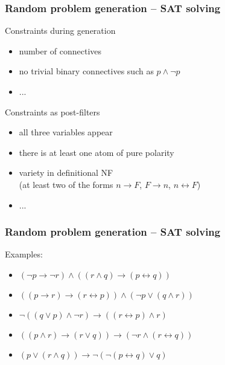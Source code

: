 \documentclass[xcolor={table}]{beamer}
\newcommand{\limpl}{\rightarrow}
\newcommand{\liff}{\leftrightarrow}
\begin{document}
\begin{frame}
    \frametitle{Random problem generation -- SAT solving}

    Constraints during generation
    \begin{itemize}
        \item
            number of connectives
        \item
            no trivial binary connectives such as $p \land \lnot p$
        \item
            ...
    \end{itemize}

    \bigskip
    \pause

    Constraints as post-filters
    \begin{itemize}
        \item
            all three variables appear
        \item
            there is at least one atom of pure polarity
        \item
            variety in definitional NF \\
            (at least two of the forms $n \limpl F$, $F \limpl n$, $n \liff F$)
        \item
            ...
    \end{itemize}
\end{frame}

\begin{frame}
    \frametitle{Random problem generation -- SAT solving}

    Examples:
    \begin{itemize}
        \item $ ( \lnot p \rightarrow \lnot r ) \land ( ( r \land q ) \rightarrow ( p \leftrightarrow q ) ) $
        \item $ ( ( p \rightarrow r ) \rightarrow ( r \leftrightarrow p ) ) \land ( \lnot p \lor ( q \land r ) ) $
        \item $ \lnot ( ( q \lor p ) \land \lnot r ) \rightarrow ( ( r \leftrightarrow p ) \land r ) $
        \item $ ( ( p \land r ) \rightarrow ( r \lor q ) ) \rightarrow ( \lnot r \land ( r \leftrightarrow q ) ) $
        \item $ ( p \lor ( r \land q ) ) \rightarrow \lnot ( \lnot ( p \leftrightarrow q ) \lor q ) $
    \end{itemize}
\end{frame}

\end{document}
